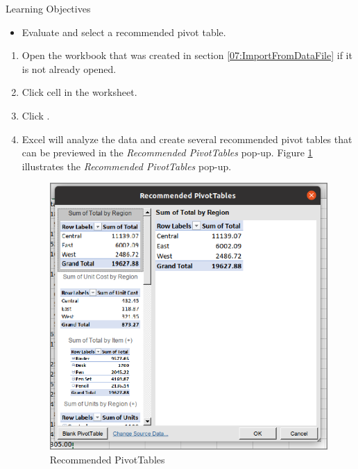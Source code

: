 \begin{center}
	\begin{objbox}{Learning Objectives}
		\begin{itemize}
			\setlength{\itemsep}{0pt}
			\setlength{\parskip}{0pt}
			\setlength{\parsep}{0pt}
			
			\item Evaluate and select a recommended pivot table.
			
		\end{itemize}
	\end{objbox}
\end{center}

\begin{enumbox}
	\begin{enumerate}
		\item Open the  workbook that was created in section \ref{07:ImportFromDataFile} if it is not already opened.
		\item Click cell  in the  worksheet.
		\item Click .
		\item Excel will analyze the data and create several recommended pivot tables that can be previewed in the \textit{Recommended PivotTables} pop-up. Figure \ref{07:fig26} illustrates the \textit{Recommended PivotTables} pop-up.

		\begin{figure}[H]
			\centering
			\includegraphics[width=\maxwidth{.95\linewidth}]{gfx/ch07_fig26}
			\caption{Recommended PivotTables}
			\label{07:fig26}
		\end{figure}


\end{enumerate}
\end{enumbox}
